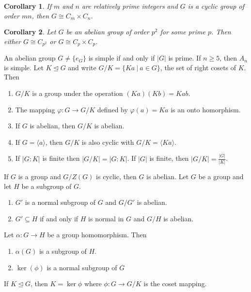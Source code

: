 \documentclass[12pt]{article}
\newenvironment{thm}[1]
{\renewcommand\theinnercustomthm{#1}\innercustomthm}
{\endinnercustomthm}
\newtheorem{cor}{Corollary}[innercustomthm]
\newcommand{\enumarabic}[1]{
	\begin{enumerate}[label=\textbf{\arabic*.}]
		#1
	\end{enumerate}
}
\theoremstyle{definition}
\newcommand{\nml}{\unlhd}
\begin{document}
\begin{cor}
	If $m$ and $n$ are relatively prime integers and $G$ is a cyclic group of order $mn$, then $G\cong C_m\times C_n$.
\end{cor}
\begin{cor}
	Let $G$ be an abelian group of order $p^2$ for some prime $p$.  Then either $G\cong C_{p^2}$ or $G\cong C_p\times C_p$.
\end{cor}
\begin{thm}{2.8.7}
	An abelian group $G\neq\{e_G\}$ is simple if and only if $|G|$ is prime.
\end{thm}
\begin{thm}{2.8.8}
	If $n\geq 5$, then $A_n$ is simple.
\end{thm}
\begin{thm}{2.9.1}
	Let $K\nml G$ and write $G/K=\{Ka\ |\ a\in G\}$, the set of right cosets of $K$. Then
	\enumarabic{
		\item $G/K$ is a group under the operation $(Ka)(Kb)=Kab$.
		\item The mapping $\varphi: G\to G/K$ defined by $\varphi(a)=Ka$ is an onto homorphism.
		\item If $G$ is abelian, then $G/K$ is abelian.
		\item If $G=\langle a\rangle$, then $G/K$ is also cyclic with $G/K=\langle Ka\rangle$.
		\item If $|G:K|$ is finite then $|G/K|=|G:K|$.  If $|G|$ is finite, then $|G/K|=\frac{|G|}{|K|}$.
	}
\end{thm}
\begin{thm}{2.9.2}
	If $G$ is a group and $G/Z(G)$ is cyclic, then $G$ is abelian.
\end{thm}
\begin{thm}{2.9.3}
	Let $G$ be a group and let $H$ be a subgroup of $G$.
	\enumarabic{
		\item $G'$ is a normal subgroup of $G$ and $G/G'$ is abelian.
		\item $G'\subseteq H$ if and only if $H$ is normal in $G$ and $G/H$ is abelian.
	}
\end{thm}
\begin{thm}{2.10.1}
	Let $\alpha\colon G\to H$ be a group homomorphism.  Then
	\enumarabic{
		\item $\alpha(G)$ is a subgroup of $H$. 
		\item $\ker(\phi)$ is a normal subgroup of $G$
	}
\end{thm}
\begin{thm}{2.10.2}
	If $K\nml G$, then $K=\ker\phi$ where $\phi\colon G\to G/K$ is the coset mapping.
\end{thm}
\end{document}
